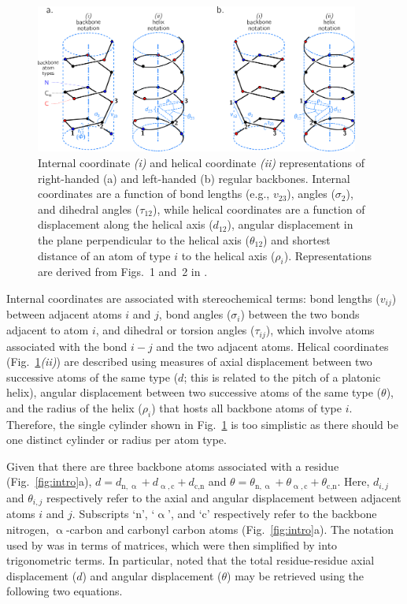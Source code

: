 \documentclass[fleqn,10pt,lineno]{wlpeerj} %
\newcommand{\n}[1]{{\color{black}#1}} %
\newcommand{\Fig}[1]{Fig.~\ref{#1}}
\begin{document}
\begin{figure}[t!]
\mbox{}\hfill
\includegraphics[width=0.95\textwidth]{./figures/helix_peptide.pdf}
\hfill\mbox{}\hfill\mbox{}\newline
\caption{\label{fig:helix}
Internal coordinate \textit{(i)} and helical coordinate \textit{(ii)} representations of right-handed (a) and left-handed (b) regular backbones. Internal coordinates are a function of bond lengths (e.g., \n{$v_{23}$}), angles ($\sigma_{2}$), and dihedral angles \n{($\tau_{12}$)}, while helical coordinates are a function of displacement along the helical axis ($d_{12}$), angular displacement in the plane perpendicular to the helical axis ($\theta_{12}$) and shortest distance of an atom of type $i$ \n{to} the helical axis ($\rho_i$). Representations are derived from Figs.~1 and~2 in  \cite{Shimanouchi1955}.
}
\end{figure}

Internal coordinates are associated with stereochemical terms: bond lengths ($v_{ij}$) between adjacent atoms $i$ and $j$, bond angles ($\sigma_{i}$) between the two bonds adjacent to atom $i$, and dihedral or torsion angles ($\tau_{ij}$), which involve atoms associated with the bond $i-j$ \n{and the two adjacent atoms}. Helical coordinates (\Fig{fig:helix}\textit{(ii)}) are described using measures of \n{axial} displacement \n{between two successive atoms of the same type} ($d$; this is related to the pitch of a platonic helix), angular displacement \n{between two successive atoms of the same type} ($\theta$), and the radius of the helix ($\rho_i$) that hosts all backbone atoms of type $i$. Therefore, the single cylinder shown in \Fig{fig:helix} is too simplistic as there should be one distinct cylinder or radius per atom type.

Given that there are three \n{backbone} atoms associated with a residue (\Fig{fig:intro}a), $d = d_{\textrm{n},\upalpha}+d_{\upalpha,\textrm{c}}+d_{\textrm{c},\textrm{n}}$ and $\theta = \theta_{\textrm{n},\upalpha}+\theta_{\upalpha,\textrm{c}}+\theta_{\textrm{c},\textrm{n}}$. Here, $d_{i,j}$ and $\theta_{i,j}$ respectively refer to the axial and angular displacement between adjacent atoms $i$ and $j$. Subscripts `$\textrm{n}$', `$\upalpha$', and `$\textrm{c}$' respectively refer to the backbone nitrogen, $\upalpha$-carbon and carbonyl carbon atoms (\Fig{fig:intro}a). The notation used by \cite{Shimanouchi1955} was in terms of matrices, which were then simplified by \cite{Miyazawa1961} into trigonometric terms. In particular, \cite{Miyazawa1961} noted that the total residue-residue \n{axial} displacement ($d$) and angular displacement ($\theta$) may be retrieved using the following two equations.
\end{document}
